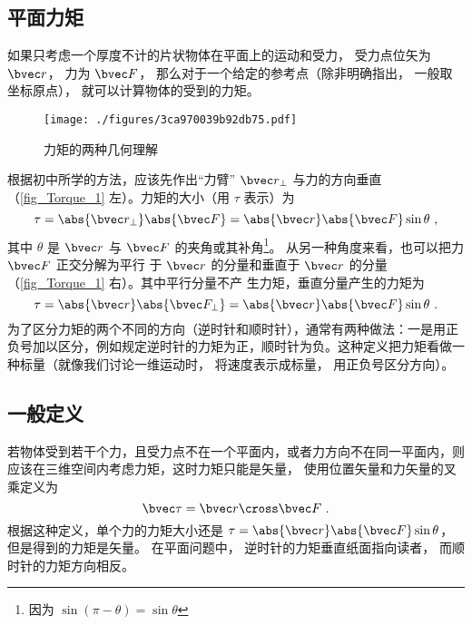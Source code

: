 

\subsection{平面力矩}

如果只考虑一个厚度不计的片状物体在平面上的运动和受力， 受力点位矢为 $\bvec r$， 力为 $\bvec F$， 那么对于一个给定的参考点（除非明确指出， 一般取坐标原点）， 就可以计算物体的受到的力矩。

\begin{figure}[ht]
\centering
\texttt{[image: ./figures/3ca970039b92db75.pdf]}
\caption{力矩的两种几何理解}\label{fig_Torque_1}
\end{figure}

根据初中所学的方法，应该先作出“力臂” $\bvec r_ \bot$ 与力的方向垂直（\autoref{fig_Torque_1} 左）。力矩的大小（用 $\tau$ 表示）为
\begin{equation}\label{eq_Torque_2}
\tau = \abs{\bvec r_ \bot } \abs{\bvec F} = \abs{\bvec r} \abs{\bvec F} \sin \theta ~,
\end{equation}
其中 $\theta $ 是 $\bvec r$ 与 $\bvec F$ 的夹角或其补角\footnote{因为 $\sin(\pi - \theta) = \sin\theta$}。 从另一种角度来看，也可以把力 $\bvec F$ 正交分解为平行
于 $\bvec r$ 的分量和垂直于 $\bvec r$ 的分量（\autoref{fig_Torque_1} 右）。其中平行分量不产
生力矩，垂直分量产生的力矩为
\begin{equation}\label{eq_Torque_1}
\tau = \abs{\bvec r} \abs{\bvec F_ \bot } = \abs{\bvec r} \abs{\bvec F} \sin \theta ~.
\end{equation}
为了区分力矩的两个不同的方向（逆时针和顺时针），通常有两种做法：一是用正负号加以区分，例如规定逆时针的力矩为正，顺时针为负。这种定义把力矩看做一种标量（就像我们讨论一维运动时， 将速度表示成标量， 用正负号区分方向）。

\subsection{一般定义}
若物体受到若干个力，且受力点不在一个平面内，或者力方向不在同一平面内，则应该在三维空间内考虑力矩，这时力矩只能是矢量， 使用位置矢量和力矢量的叉乘定义为
\begin{equation}\label{eq_Torque_3}
\bvec \tau = \bvec r \cross \bvec F~.
\end{equation}
根据这种定义，单个力的力矩大小还是 $\tau = \abs{\bvec r} \abs{\bvec F}\sin \theta$， 但是得到的力矩是矢量。 在平面问题中， 逆时针的力矩垂直纸面指向读者， 而顺时针的力矩方向相反。

